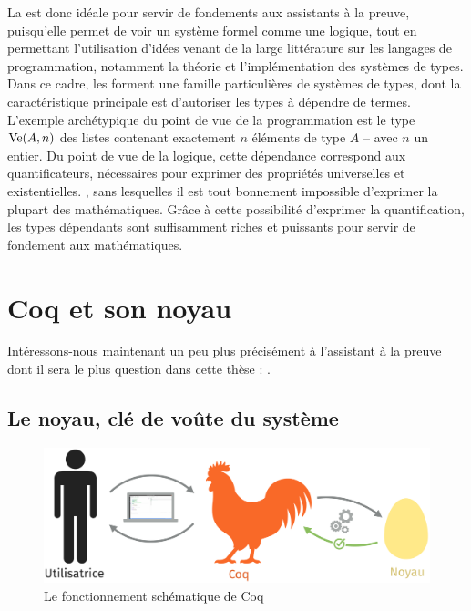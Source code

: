 La  est donc idéale pour servir de fondements aux
assistants à la preuve, puisqu’elle permet de voir un système formel
comme une logique, tout en permettant l’utilisation d’idées venant de
la large littérature sur les langages de programmation, notamment
la théorie et l’implémentation des systèmes de types.
Dans ce cadre, les  
forment une famille particulières de systèmes de types, dont la
caractéristique principale est d’autoriser les types à dépendre de termes.
L’exemple archétypique du point de vue de la  programmation est le type
$\operatorname{Ve}(A,n)$ des listes contenant exactement $n$ éléments
de type $A$ – avec $n$ un entier.
Du point de vue de la logique, cette
dépendance correspond aux quantificateurs, nécessaires pour exprimer des
propriétés universelles%
 et existentielles.%
,
sans lesquelles il est tout bonnement impossible d’exprimer la plupart des
mathématiques.
Grâce à cette possibilité d’exprimer la quantification,
les types dépendants sont suffisamment riches et puissants pour
servir de fondement aux mathématiques.

\section{Coq et son noyau}
\label{sec:intro-coq}

Intéressons-nous maintenant un peu plus précisément à l’assistant à la
preuve dont il sera le plus question dans cette thèse : .

\subsection[Le noyau]{Le noyau, clé de voûte du système}

\begin{figure}[h]

  \centering
  \includegraphics{./figures/coq-kernel-fr.pdf}

  \caption{Le fonctionnement schématique de Coq}
  \label{fig-coq}
\end{figure}

